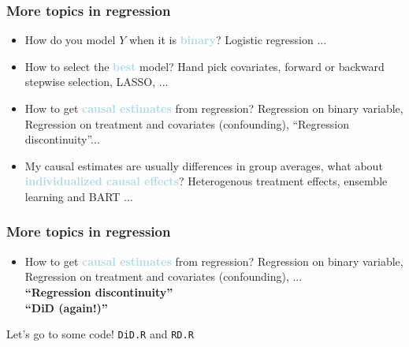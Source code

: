 \documentclass{beamer}
\newcommand{\bo}[1]{\textcolor{burntorange}{#1}}
\newcommand{\lb}[1]{\textcolor{lightblue}{#1}}
\newcommand{\sko}{\vspace{.1in}}
\newcommand{\skooo}{\vspace{.3in}}
\begin{document}
\begin{frame}
	\frametitle{More topics in regression}
	
	\begin{itemize}
		\item How do you model $Y$ when it is \lb{\bf binary}? \bo{Logistic regression ...} \sko
		\item How to select the \lb{\bf best} model? \bo{Hand pick covariates, forward or backward stepwise selection, LASSO, ...} \sko
		\item How to get \lb{\bf causal estimates} from regression?  \bo{Regression on binary variable, Regression on treatment and covariates (confounding), ``Regression discontinuity''...} \sko
		\item My causal estimates are usually differences in group averages, what about \lb{\bf individualized causal effects}? \bo{Heterogenous treatment effects, ensemble learning and BART ...}
	\end{itemize}
	
	
\end{frame}


\begin{frame}
	\frametitle{More topics in regression}
	
	\begin{itemize}
		\item How to get \lb{\bf causal estimates} from regression?  \bo{Regression on binary variable, Regression on treatment and covariates (confounding), ... \vspace{3mm}\\ {\bf``Regression discontinuity''} \vspace{1mm}\\ {\bf``DiD (again!)''}} \sko
	\end{itemize}
	
	
	\skooo
	Let's go to some code! {\tt DiD.R} and {\tt RD.R}
	
	
	
\end{frame}
\end{document}
